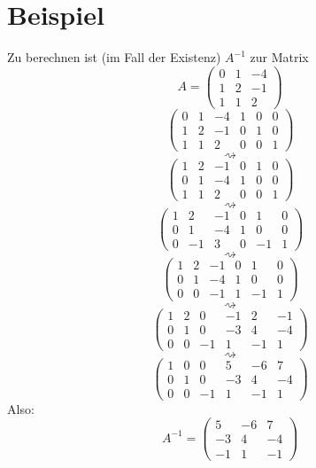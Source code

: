 \documentclass{scrbook}
\begin{document}
\section{Beispiel}
Zu berechnen ist (im Fall der Existenz) $A^{-1}$ zur Matrix\[
A=\left(
\begin{array}{rrr}
0&1&-4\\
1&2&-1\\
1&1&2
\end{array}
\right)
\]
\[
\left(
\begin{array}{rrr|rrr}
0&1&-4&1&0&0\\
1&2&-1&0&1&0\\
1&1&2&0&0&1
\end{array}
\right)
\]
\[
\rightsquigarrow
\]
\[
\left(
\begin{array}{rrr|rrr}
1&2&-1&0&1&0\\
0&1&-4&1&0&0\\
1&1&2&0&0&1
\end{array}
\right)
\]\[
\rightsquigarrow
\]
\[
\left(
\begin{array}{rrr|rrr}
1&2&-1&0&1&0\\
0&1&-4&1&0&0\\
0&-1&3&0&-1&1
\end{array}
\right)
\]
\[
\rightsquigarrow
\]
\[
\left(
\begin{array}{rrr|rrr}
1&2&-1&0&1&0\\
0&1&-4&1&0&0\\
0&0&-1&1&-1&1
\end{array}
\right)
\]
\[
\rightsquigarrow
\]
\[
\left(
\begin{array}{rrr|rrr}
1&2&0&-1&2&-1\\
0&1&0&-3&4&-4\\
0&0&-1&1&-1&1
\end{array}
\right)
\]
\[
\rightsquigarrow
\]
\[
\left(
\begin{array}{rrr|rrr}
1&0&0&5&-6&7\\
0&1&0&-3&4&-4\\
0&0&-1&1&-1&1
\end{array}
\right)
\]
Also: \[A^{-1} = 
\left(
\begin{array}{rrr}
5&-6&7\\
-3&4&-4\\
-1&1&-1
\end{array}
\right)\]
\end{document}
